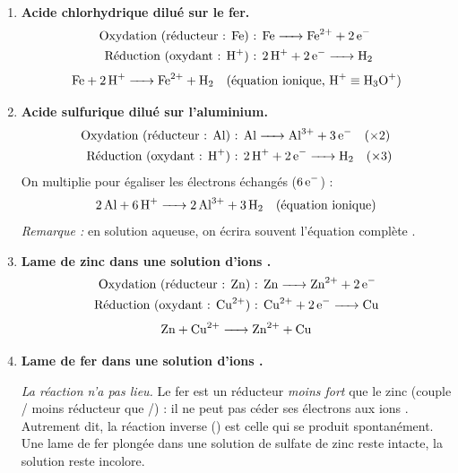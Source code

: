 \documentclass[11pt]{article}
\begin{document}
\begin{corrige}
\begin{enumerate}
\item \textbf{Acide chlorhydrique dilué sur le fer.}
\begin{align*}
\text{Oxydation (réducteur : } \ce{Fe}\text{) : } & \ce{Fe -> Fe^2+ + 2e-} \\
\text{Réduction (oxydant : } \ce{H+}\text{) : } & \ce{2H+ + 2e- -> H2}
\end{align*}
\[ \ce{Fe + 2H+ -> Fe^2+ + H2} \quad \text{(équation ionique, } \ce{H+} \equiv \ce{H3O+}\text{)} \]

\item \textbf{Acide sulfurique dilué sur l'aluminium.}
\begin{align*}
\text{Oxydation (réducteur : } \ce{Al}\text{) : } & \ce{Al -> Al^3+ + 3e-} \quad (\times 2) \\
\text{Réduction (oxydant : } \ce{H+}\text{) : } & \ce{2H+ + 2e- -> H2} \quad (\times 3)
\end{align*}
On multiplie pour égaliser les électrons échangés ($6\,\ce{e-}$) :
\[ \ce{2Al + 6H+ -> 2Al^3+ + 3H2} \quad \text{(équation ionique)} \]
\emph{Remarque :} en solution aqueuse, on écrira souvent l'équation complète .

\item \textbf{Lame de zinc dans une solution d'ions .}
\begin{align*}
\text{Oxydation (réducteur : } \ce{Zn}\text{) : } & \ce{Zn -> Zn^2+ + 2e-} \\
\text{Réduction (oxydant : } \ce{Cu^2+}\text{) : } & \ce{Cu^2+ + 2e- -> Cu}
\end{align*}
\[ \ce{Zn + Cu^2+ -> Zn^2+ + Cu} \]

\item \textbf{Lame de fer dans une solution d'ions .}

\emph{La réaction n'a pas lieu.} Le fer est un réducteur \emph{moins fort} que le zinc (couple / moins réducteur que /) : il ne peut pas céder ses électrons aux ions . Autrement dit, la réaction inverse () est celle qui se produit spontanément. Une lame de fer plongée dans une solution de sulfate de zinc reste intacte, la solution reste incolore.
\end{enumerate}
\end{corrige}
\end{document}
